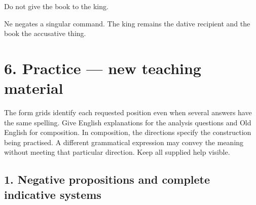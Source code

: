 Do not give the book to the king.

Ne negates a singular command. The king remains the dative recipient and the book the accusative thing.

\section*{6. Practice — new teaching material}

The form grids identify each requested position even when several answers have the same spelling. Give English explanations for the analysis questions and Old English for composition. In composition, the directions specify the construction being practised. A different grammatical expression may convey the meaning without meeting that particular direction. Keep all supplied help visible.

\subsection*{1. Negative propositions and complete indicative systems}


